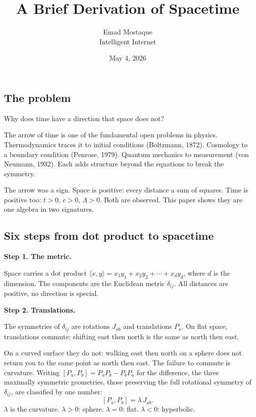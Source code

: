 \documentclass[11pt]{article}
\title{\textbf{A Brief Derivation of Spacetime}}
\author{Emad Mostaque\\[2pt]{\normalsize Intelligent Internet}}
\date{May 4, 2026}
\begin{document}
\maketitle
\thispagestyle{empty}
\vspace{-1.5em}

\subsection*{The problem}

Why does time have a direction that space does not?

The arrow of time is one of the fundamental open problems in physics. Thermodynamics traces it to initial conditions (Boltzmann, 1872). Cosmology to a boundary condition (Penrose, 1979). Quantum mechanics to measurement (von Neumann, 1932). Each adds structure beyond the equations to break the symmetry.

The arrow was a sign. Space is positive: every distance a sum of squares. Time is positive too: $t > 0$, $c > 0$, $\Lambda > 0$. Both are observed. This paper shows they are one algebra in two signatures.

\subsection*{Six steps from dot product to spacetime}

\textbf{Step 1.\; The metric.}

Space carries a dot product $\langle x, y \rangle = x_1 y_1 + x_2 y_2 + \cdots + x_d y_d$, where $d$ is the dimension. The components are the Euclidean metric $\delta_{ij}$. All distances are positive, no direction is special.

\textbf{Step 2.\; Translations.}

The symmetries of $\delta_{ij}$ are rotations $J_{ab}$ and translations $P_a$. On flat space, translations commute: shifting east then north is the same as north then east.

On a curved surface they do not: walking east then north on a sphere does not return you to the same point as north then east. The failure to commute is curvature. Writing $[P_a, P_b] = P_a P_b - P_b P_a$ for the difference, the three maximally symmetric geometries, those preserving the full rotational symmetry of $\delta_{ij}$, are classified by one number:
\[
[P_a, P_b] = \lambda\,J_{ab}.
\]
$\lambda$ is the curvature. $\lambda > 0$: sphere. $\lambda = 0$: flat. $\lambda < 0$: hyperbolic.
\end{document}
